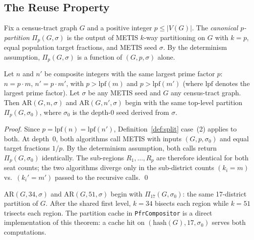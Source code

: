 \subsection{The Reuse Property}
\label{sec:reuse}

\begin{definition}
  Fix a census-tract graph $G$ and a positive integer $p \leq |V(G)|$. The
  \emph{canonical $p$-partition} $\Pi_p(G, \sigma)$ is the output of METIS
  $k$-way partitioning on $G$ with $k = p$, equal population target fractions,
  and METIS seed $\sigma$. By the determinism assumption, $\Pi_p(G, \sigma)$ is
  a function of $(G, p, \sigma)$ alone.
\end{definition}

\begin{theorem}[Reuse]
  \label{thm:reuse}
  Let $n$ and $n'$ be composite integers with the same largest prime factor $p$:
  $n = p \cdot m$, $n' = p \cdot m'$, with $p > \text{lpf}(m)$ and
  $p > \text{lpf}(m')$ (where $\text{lpf}$ denotes the largest prime factor).
  Let $\sigma$ be any METIS seed and $G$ any census-tract graph. Then
  $\text{AR}(G, n, \sigma)$ and $\text{AR}(G, n', \sigma)$ begin with the
  same top-level partition $\Pi_p(G, \sigma_0)$, where $\sigma_0$ is the
  depth-0 seed derived from $\sigma$.
\end{theorem}

\begin{proof}
  Since $p = \text{lpf}(n) = \text{lpf}(n')$, Definition~\ref{def:split}
  case~(2) applies to both. At depth~0, both algorithms call METIS with
  inputs $(G, p, \sigma_0)$ and equal target fractions $1/p$. By the
  determinism assumption, both calls return $\Pi_p(G, \sigma_0)$
  identically. The sub-regions $R_1, \ldots, R_p$ are therefore identical
  for both seat counts; the two algorithms diverge only in the sub-district
  counts $(k_i = m)$ vs.\ $(k_i' = m')$ passed to the recursive calls.
  \qed
\end{proof}

\begin{corollary}
  $\text{AR}(G, 34, \sigma)$ and $\text{AR}(G, 51, \sigma)$ begin with
  $\Pi_{17}(G, \sigma_0)$: the same 17-district partition of $G$.
  After the shared first level, $k=34$ bisects each region while
  $k=51$ trisects each region. The partition cache in \texttt{PfrCompositor}
  is a direct implementation of this theorem: a cache hit on
  $(\text{hash}(G), 17, \sigma_0)$ serves both computations.
\end{corollary}

